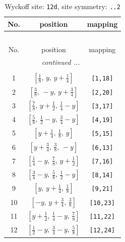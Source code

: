 \documentclass[fleqn,8pt]{jsarticle}
\begin{document}
\begin{longtable}{ccc}
\caption{Wyckoff site: {\tt 12d}, site symmetry: {\tt ..2}}
 \\
 \hline \hline
No. & position & mapping \\ \hline \endfirsthead

\multicolumn{2}{l}{\tablename\ \thetable{}} \\
 \hline \hline
No. & position & mapping \\ \hline \endhead

 \hline \hline
\multicolumn{2}{r}{\footnotesize\it continued ...} \\ \endfoot

 \hline \hline
\multicolumn{2}{r}{} \\ \endlastfoot

1 & $\left[ \frac{1}{8},\, y,\, y + \frac{1}{4} \right]$ & {\tt [1,18]} \\ \hline
2 & $\left[ \frac{3}{8},\, - y,\, y + \frac{3}{4} \right]$ & {\tt [2,20]} \\ \hline
3 & $\left[ \frac{7}{8},\, y + \frac{1}{2},\, \frac{1}{4} - y \right]$ & {\tt [3,17]} \\ \hline
4 & $\left[ \frac{5}{8},\, \frac{1}{2} - y,\, \frac{3}{4} - y \right]$ & {\tt [4,19]} \\ \hline
5 & $\left[ y + \frac{1}{4},\, \frac{1}{8},\, y \right]$ & {\tt [5,15]} \\ \hline
6 & $\left[ y + \frac{3}{4},\, \frac{3}{8},\, - y \right]$ & {\tt [6,13]} \\ \hline
7 & $\left[ \frac{1}{4} - y,\, \frac{7}{8},\, y + \frac{1}{2} \right]$ & {\tt [7,16]} \\ \hline
8 & $\left[ \frac{3}{4} - y,\, \frac{5}{8},\, \frac{1}{2} - y \right]$ & {\tt [8,14]} \\ \hline
9 & $\left[ y,\, y + \frac{1}{4},\, \frac{1}{8} \right]$ & {\tt [9,21]} \\ \hline
10 & $\left[ - y,\, y + \frac{3}{4},\, \frac{3}{8} \right]$ & {\tt [10,23]} \\ \hline
11 & $\left[ y + \frac{1}{2},\, \frac{1}{4} - y,\, \frac{7}{8} \right]$ & {\tt [11,22]} \\ \hline
12 & $\left[ \frac{1}{2} - y,\, \frac{3}{4} - y,\, \frac{5}{8} \right]$ & {\tt [12,24]} \\
\end{longtable}
\renewcommand{\arraystretch}{1.2}
\end{document}
